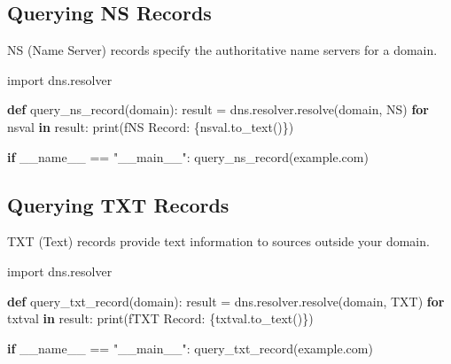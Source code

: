 \documentclass[
  letterpaper,
  DIV=11,
  numbers=noendperiod]{scrreprt}
\newenvironment{Shaded}{\begin{snugshade}}{\end{snugshade}}
\newcommand{\BuiltInTok}[1]{\textcolor[rgb]{0.00,0.23,0.31}{#1}}
\newcommand{\ControlFlowTok}[1]{\textcolor[rgb]{0.00,0.23,0.31}{\textbf{#1}}}
\newcommand{\ImportTok}[1]{\textcolor[rgb]{0.00,0.46,0.62}{#1}}
\newcommand{\KeywordTok}[1]{\textcolor[rgb]{0.00,0.23,0.31}{\textbf{#1}}}
\newcommand{\NormalTok}[1]{\textcolor[rgb]{0.00,0.23,0.31}{#1}}
\newcommand{\OperatorTok}[1]{\textcolor[rgb]{0.37,0.37,0.37}{#1}}
\newcommand{\SpecialCharTok}[1]{\textcolor[rgb]{0.37,0.37,0.37}{#1}}
\newcommand{\SpecialStringTok}[1]{\textcolor[rgb]{0.13,0.47,0.30}{#1}}
\newcommand{\StringTok}[1]{\textcolor[rgb]{0.13,0.47,0.30}{#1}}
\newcommand{\VariableTok}[1]{\textcolor[rgb]{0.07,0.07,0.07}{#1}}
\begin{document}
\subsection{Querying NS Records}\label{querying-ns-records}

NS (Name Server) records specify the authoritative name servers for a
domain.

\begin{Shaded}
\begin{Highlighting}[]
\ImportTok{import}\NormalTok{ dns.resolver}

\KeywordTok{def}\NormalTok{ query\_ns\_record(domain):}
\NormalTok{    result }\OperatorTok{=}\NormalTok{ dns.resolver.resolve(domain, }\StringTok{\textquotesingle{}NS\textquotesingle{}}\NormalTok{)}
    \ControlFlowTok{for}\NormalTok{ nsval }\KeywordTok{in}\NormalTok{ result:}
        \BuiltInTok{print}\NormalTok{(}\SpecialStringTok{f\textquotesingle{}NS Record: }\SpecialCharTok{\{}\NormalTok{nsval}\SpecialCharTok{.}\NormalTok{to\_text()}\SpecialCharTok{\}}\SpecialStringTok{\textquotesingle{}}\NormalTok{)}

\ControlFlowTok{if} \VariableTok{\_\_name\_\_} \OperatorTok{==} \StringTok{"\_\_main\_\_"}\NormalTok{:}
\NormalTok{    query\_ns\_record(}\StringTok{\textquotesingle{}example.com\textquotesingle{}}\NormalTok{)}
\end{Highlighting}
\end{Shaded}

\subsection{Querying TXT Records}\label{querying-txt-records}

TXT (Text) records provide text information to sources outside your
domain.

\begin{Shaded}
\begin{Highlighting}[]
\ImportTok{import}\NormalTok{ dns.resolver}

\KeywordTok{def}\NormalTok{ query\_txt\_record(domain):}
\NormalTok{    result }\OperatorTok{=}\NormalTok{ dns.resolver.resolve(domain, }\StringTok{\textquotesingle{}TXT\textquotesingle{}}\NormalTok{)}
    \ControlFlowTok{for}\NormalTok{ txtval }\KeywordTok{in}\NormalTok{ result:}
        \BuiltInTok{print}\NormalTok{(}\SpecialStringTok{f\textquotesingle{}TXT Record: }\SpecialCharTok{\{}\NormalTok{txtval}\SpecialCharTok{.}\NormalTok{to\_text()}\SpecialCharTok{\}}\SpecialStringTok{\textquotesingle{}}\NormalTok{)}

\ControlFlowTok{if} \VariableTok{\_\_name\_\_} \OperatorTok{==} \StringTok{"\_\_main\_\_"}\NormalTok{:}
\NormalTok{    query\_txt\_record(}\StringTok{\textquotesingle{}example.com\textquotesingle{}}\NormalTok{)}
\end{Highlighting}
\end{Shaded}
\end{document}
